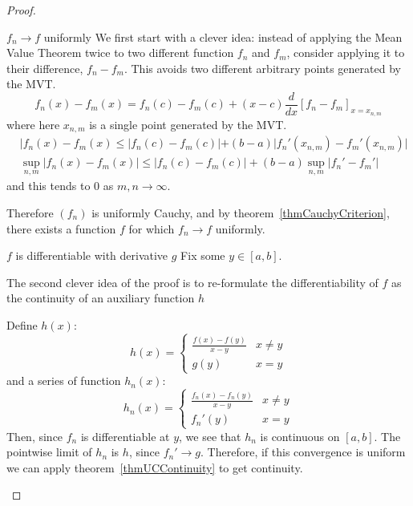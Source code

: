 \documentclass[../Main.tex]{subfiles}
\begin{document}
\begin{proof}
    \begin{subproof}{$f_n \to f$ uniformly}
        We first start with a clever idea: instead of applying the Mean Value Theorem twice to two different function $f_n$ and $f_m$, consider applying it to their difference, $f_n - f_m$. This avoids two different arbitrary points generated by the MVT.
        \begin{equation*}
            f_n(x) - f_m(x) = f_n(c) - f_m(c) + (x - c) \frac{d}{dx}\left[f_n - f_m\right]_{x = x_{n, m}}
        \end{equation*}
        where here $x_{n, m}$ is a single point generated by the MVT.
        \begin{align*}
            &|f_n(x) - f_m(x) \leq |f_n(c) - f_m(c)| + (b - a) |f_n'(x_{n, m}) - f_m'(x_{n, m})| \\
            &\sup_{n, m} |f_n(x) - f_m(x)| \leq |f_n(c) - f_m(c)| + (b-a) \sup_{n, m} |f_n' - f_m'|
        \end{align*}
        and this tends to $0$ as $m, n \to \infty$.

        Therefore $(f_n)$ is uniformly Cauchy, and by theorem~\ref{thmCauchyCriterion}, there exists a function $f$ for which $f_n \to f$ uniformly.
    \end{subproof}
    \begin{subproof}{$f$ is differentiable with derivative $g$}
        Fix some $y \in [a, b]$.
        
        The second clever idea of the proof is to re-formulate the differentiability of $f$ as the continuity of an auxiliary function $h$

        Define $h(x)$:
        \begin{equation*}
            h(x) =
            \begin{cases}
                \frac{f(x) - f(y)}{x - y} & x \neq y \\
                g(y) & x = y
            \end{cases}
        \end{equation*}
        and a series of function $h_n(x)$:
        \begin{equation*}
            h_n(x) =
            \begin{cases}
                \frac{f_n(x) - f_n(y)}{x - y} & x \neq y \\
                f_n'(y) & x = y
            \end{cases}
        \end{equation*}
        Then, since $f_n$ is differentiable at $y$, we see that $h_n$ is continuous on $[a, b]$.
        The pointwise limit of $h_n$ is $h$, since $f_n' \to g$. Therefore, if this convergence is uniform we can apply theorem~\ref{thmUCContinuity} to get continuity.


\end{subproof}
\end{proof}
\end{document}
